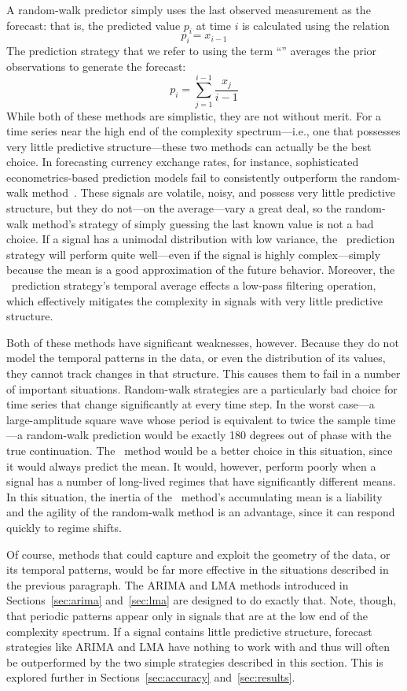 A random-walk predictor simply uses the last observed measurement as
the forecast: that is, the predicted value $p_i$ at time $i$ is
calculated using the relation $$p_i = x_{i-1}$$ The prediction
strategy that we refer to using the term ``\naive'' averages the prior
observations to generate the forecast: $$p_i =
\sum_{j=1}^{i-1}\frac{x_j}{i-1}$$ While both of these methods are
simplistic, they are not without merit.  For a time series near the
high end of the complexity spectrum---i.e., one that possesses very
little predictive structure---these two methods can actually be the
best choice.  In forecasting currency exchange rates, for instance,
sophisticated econometrics-based prediction models fail to
consistently outperform the random-walk method~\cite{rwMeese,rwCCE}.
These signals are volatile, noisy, and possess very little predictive
structure, but they do not---on the average---vary a great deal, so
the random-walk method's strategy of simply guessing the last known
value is not a bad choice.  If a signal has a unimodal distribution
with low variance, the \naive ~prediction strategy will perform quite
well---even if the signal is highly complex---simply because the mean
is a good approximation of the future behavior.  Moreover, the \naive
~prediction strategy's temporal average effects a low-pass filtering
operation, which effectively mitigates the complexity in signals with
very little predictive structure.

Both of these methods have significant weaknesses, however.  Because
they do not model the temporal patterns in the data, or even the
distribution of its values, they cannot track changes in that
structure.  This causes them to fail in a number of important
situations.  Random-walk strategies are a particularly bad choice for
time series that change significantly at every time step.  In the
worst case---a large-amplitude square wave whose period is equivalent
to twice the sample time---a random-walk prediction would be exactly
180 degrees out of phase with the true continuation.  The \naive
~method would be a better choice in this situation, since it would
always predict the mean.  It would, however, perform poorly when a
signal has a number of long-lived regimes that have significantly
different means.  In this situation, the inertia of the \naive
~method's accumulating mean is a liability and the agility of the
random-walk method is an advantage, since it can respond quickly to
regime shifts.

Of course, methods that could capture and exploit the geometry of the
data, or its temporal patterns, would be far more effective in the
situations described in the previous paragraph.  The ARIMA and LMA
methods introduced in Sections~\ref{sec:arima} and~\ref{sec:lma} are
designed to do exactly that.  Note, though, that periodic patterns
appear only in signals that are at the low end of the complexity
spectrum.  If a signal contains little predictive structure, forecast
strategies like ARIMA and LMA have nothing to work with and thus will
often be outperformed by the two simple strategies described in this
section.  This is explored further in Sections~\ref{sec:accuracy}
and~\ref{sec:results}.


